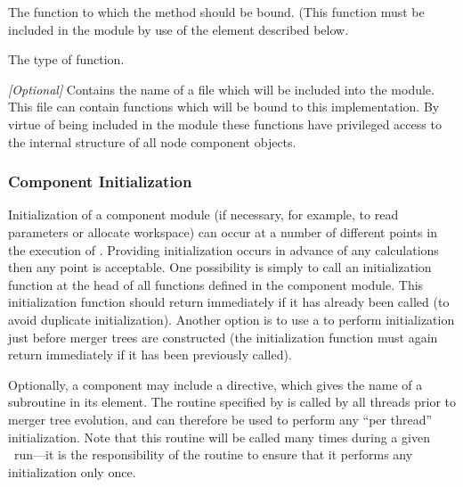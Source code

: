 \begin{description}
\begin{description}
\begin{verbatim}
\end{verbatim}
\item [\mono{function}] The function to which the method should be bound. (This function must be included in the \href{https://github.com/galacticusorg/galacticus/releases/download/bleeding-edge/Galacticus_Source.pdf#source.objects_nodes_F90:galacticus_nodes} module by use of the  element described below.
\item [\mono{type}] The type of function.
\end{description}
\item [\mono{functions}] \emph{[Optional]} Contains the name of a file which will be included into the \href{https://github.com/galacticusorg/galacticus/releases/download/bleeding-edge/Galacticus_Source.pdf#source.objects_nodes_F90:galacticus_nodes} module. This file can contain functions which will be bound to this implementation. By virtue of being included in the \href{https://github.com/galacticusorg/galacticus/releases/download/bleeding-edge/Galacticus_Source.pdf#source.objects_nodes_F90:galacticus_nodes} module these functions have privileged access to the internal structure of all node component objects.
\end{description}

\subsubsection{Component Initialization}

Initialization of a component module (if necessary, for example, to read parameters or allocate workspace) can occur at a number of different points in the execution of \glc. Providing initialization occurs in advance of any calculations then any point is acceptable. One possibility is simply to call an initialization function at the head of all functions defined in the component module. This initialization function should return immediately if it has already been called (to avoid duplicate initialization). Another option is to use a  to perform initialization just before merger trees are constructed (the initialization function must again return immediately if it has been previously called).

Optionally, a component may include a  directive, which gives the name of a subroutine in its  element. The routine specified by  is called by all threads prior to merger tree evolution, and can therefore be used to perform any ``per thread'' initialization. Note that this routine will be called many times during a given \glc\ run---it is the responsibility of the routine to ensure that it performs any initialization only once.

